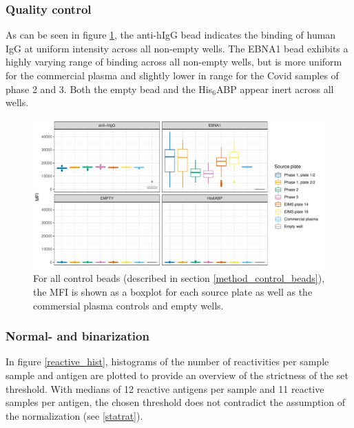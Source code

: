 \documentclass{article}
\begin{document}
\newpage
\subsubsection{Quality control}
As can be seen in figure \ref{fig_control_beads}, the anti-hIgG bead indicates the binding of human IgG at uniform intensity across all non-empty wells. The EBNA1 bead exhibits a highly varying range of binding across all non-empty wells, but is more uniform for the commercial plasma and slightly lower in range for the Covid samples of phase 2 and 3. Both the empty bead and the His$_6$ABP appear inert across all wells.

\begin{figure}[H]
	\centering
	\includegraphics[width=\linewidth]{figures/control_beads.pdf}
	\caption{For all control beads (described in section \ref{method_control_beads}), the MFI is shown as a boxplot for each source plate as well as the commersial plasma controls and empty wells.}
	\label{fig_control_beads}
\end{figure}

\newpage
\subsubsection{Normal- and binarization}\label{res_norm}
In figure \ref{reactive_hist}, histograms of the number of reactivities per sample sample and antigen are plotted to provide an overview of the strictness of the set threshold. With medians of 12 reactive antigens per sample and 11 reactive samples per antigen, the chosen threshold does not contradict the assumption of the normalization (see \ref{statrat}).
\end{document}
